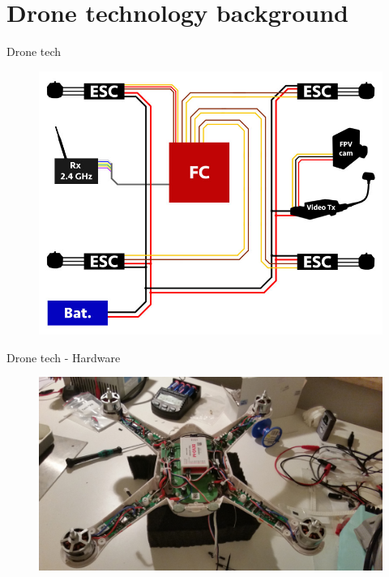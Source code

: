 \documentclass[aspectratio=169]{beamer}
\begin{document}
\section{Drone technology background}
\begin{frame}{Drone tech}
	\begin{figure}
		\includegraphics[width=0.6\linewidth]{images/06-FPV-Overview_1.jpg}
	\end{figure}
	\color{gray}{http://fpvracing.ch/img/cms/infobereich/Bauanleitung/06-FPV-Overview\_1.jpg}
\end{frame}

\begin{frame}{Drone tech - Hardware}
	\begin{figure}
		\includegraphics[width=0.9\linewidth]{images/qrx350pro_disassembled.jpg}
	\end{figure}
\end{frame}
\end{document}
